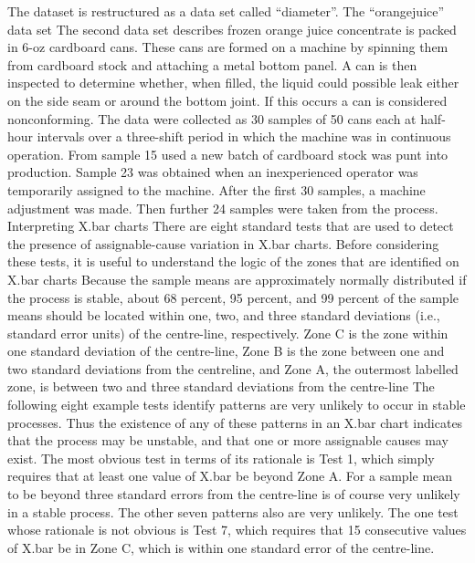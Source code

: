The dataset is restructured as a data set called “diameter”.
The “orangejuice” data set
The second data set describes frozen orange juice concentrate is packed in 6-oz cardboard cans. These cans are formed on a machine by spinning them from cardboard stock and attaching a metal bottom panel.
A can is then inspected to determine whether, when filled, the liquid could possible leak either on the side seam or around the bottom joint. If this occurs a can is considered nonconforming.
The data were collected as 30 samples of 50 cans each at half-hour intervals over a three-shift period in which the machine was in continuous operation. From sample 15 used a new batch of cardboard stock was punt into production.
Sample 23 was obtained when an inexperienced operator was temporarily assigned to the machine. After the first 30 samples, a machine adjustment was made. Then further 24 samples were taken from the process.
Interpreting X.bar charts
There are eight standard tests that are used to detect the presence of assignable-cause variation in X.bar charts. Before considering these tests, it is useful to understand the logic of the zones that are identified on X.bar charts
Because the sample means are approximately normally distributed if the process is stable, about 68 percent, 95 percent, and 99 percent of the sample means should be located within one, two, and three standard deviations (i.e., standard error units) of the centre-line, respectively.
Zone C is the zone within one standard deviation of the centre-line, Zone B is the zone between one and two standard deviations from the centreline, and Zone A, the outermost labelled zone, is between two and three standard deviations from the centre-line
The following eight example tests identify patterns are very unlikely to occur in stable processes.
Thus the existence of any of these patterns in an X.bar chart indicates that the process may be unstable, and that one or more assignable causes may exist.
The most obvious test in terms of its rationale is Test 1, which simply requires that at least one value of X.bar be beyond Zone A. For a sample mean to be beyond three standard errors from the centre-line is of course very unlikely in a stable process. The other seven patterns also are very unlikely.
The one test whose rationale is not obvious is Test 7, which requires that 15 consecutive values of X.bar be in Zone C, which is within one standard error of the centre-line.
